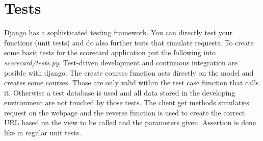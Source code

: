 \section{Tests}

Django has a sophisticated testing framework. You can directly test your functions (unit tests) and do also further tests that simulate requests. To create some basic tests for the scorecard application put the following into \emph{scorecard/tests.py}. Test-driven development and continuous integration are posible with django. The create courses function acts directly on the model and creates some courses. Those are only valid within the test case function that calls it. Otherwise a test database is used and all data stored in the developing environment are not touched by those tests. The client get methods simulaties request on the webpage and the reverse function is used to create the correct URL based on the view to be called and the parameters given. Assertion is done like in regular unit tests.


